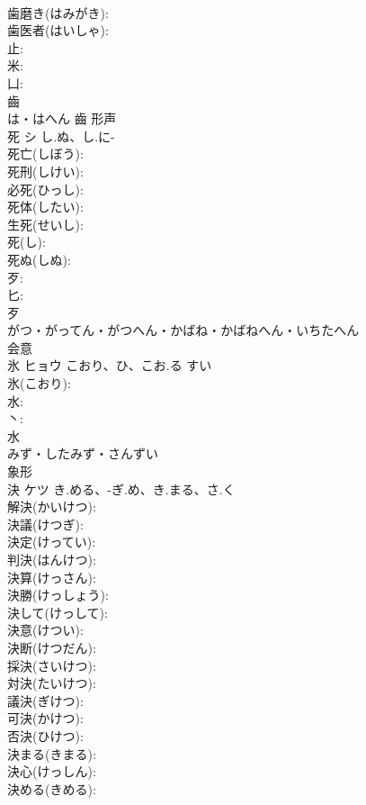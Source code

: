 \documentclass[8pt]{extreport}
\begin{document}
\begin{CJK}{UTF8}{min}
\\	歯磨き(はみがき): 
\\	歯医者(はいしゃ): 
\\	止: 
\\	米: 
\\	凵: 
\\	齒	
\\	は・はへん	齒	形声 
\\	死	シ	し.ぬ、し.に-		
\\	死亡(しぼう): 
\\	死刑(しけい): 
\\	必死(ひっし): 
\\	死体(したい): 
\\	生死(せいし): 
\\	死(し): 
\\	死ぬ(しぬ): 
\\	歹: 
\\	匕: 
\\	歹	
\\	がつ・がってん・がつへん・かばね・かばねへん・いちたへん	
\\	会意 
\\	氷	ヒョウ	こおり、ひ、こお.る	すい	
\\	氷(こおり): 
\\	水: 
\\	丶: 
\\	水	
\\	みず・したみず・さんずい	
\\	象形 
\\	決	ケツ	き.める、-ぎ.め、き.まる、さ.く		
\\	解決(かいけつ): 
\\	決議(けつぎ): 
\\	決定(けってい): 
\\	判決(はんけつ): 
\\	決算(けっさん): 
\\	決勝(けっしょう): 
\\	決して(けっして): 
\\	決意(けつい): 
\\	決断(けつだん): 
\\	採決(さいけつ): 
\\	対決(たいけつ): 
\\	議決(ぎけつ): 
\\	可決(かけつ): 
\\	否決(ひけつ): 
\\	決まる(きまる): 
\\	決心(けっしん): 
\\	決める(きめる): 

\end{CJK}
\end{document}
